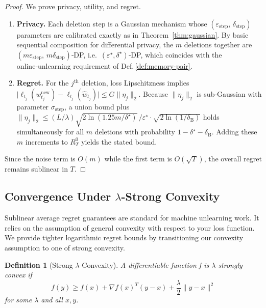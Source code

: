 \documentclass[a4paper,12pt]{article}
\newtheorem{definition}[theorem]{Definition}
\begin{document}
\begin{proof}

We prove privacy, utility, and regret.
\begin{enumerate}
    \item \textbf{Privacy.} Each deletion step is a Gaussian mechanism whose $(\varepsilon_{\text{step}},\, \delta_{\text{step}})$ parameters are calibrated exactly as in Theorem~\ref{thm:gaussian}. By basic sequential composition for differential privacy, the $m$ deletions together are $(m\varepsilon_{\text{step}},\,m\delta_{\text{step}})$‑DP, i.e.\
$(\varepsilon^\star,\delta^\star)$‑DP, which coincides with the online‑unlearning requirement of Def.\,\ref{def:memory-pair}.

    \item \textbf{Regret.} For the $j^{\text{th}}$ deletion, loss Lipschitzness implies 
$\bigl|\ell_{t_j}(w_{t_j}^{\text{new}})-\ell_{t_j}(\hat w_{t_j})\bigr|
      \le G\lVert\eta_j\rVert_{2}$.
Because $\lVert\eta_j\rVert_{2}$ is sub‑Gaussian with parameter
$\sigma_{\text{step}}$, a union bound plus
$\|\eta_j\|_{2} \le
  (L/\lambda)\sqrt{2\ln(1.25m/\delta^{\star})}\,/\varepsilon^{\star}
  \cdot\sqrt{2\ln(1/\delta_{\mathrm{B}})}$
holds simultaneously for all $m$ deletions
with probability $1-\delta^\star-\delta_{\mathrm{B}}$.
Adding these $m$ increments to $R_{T}^{0}$ yields the stated bound.
\end{enumerate}

Since the noise term is $O(m)$ while the first term is
$O(\sqrt{T})$, the overall regret remains sublinear in $T$.
\end{proof}

\subsection{Convergence Under $\lambda$-Strong Convexity}

Sublinear average regret guarantees are standard for machine unlearning work. It relies on the assumption of general convexity with respect to your loss function. We provide tighter logarithmic regret bounds by transitioning our convexity assumption to one of strong convexity.

\begin{definition}[Strong $\lambda$-Convexity]
    A differentiable function f is $\lambda$-strongly convex if 
    $$
    f(y) \geq f(x) + \nabla f(x)^{T}(y-x)+ \frac{\lambda}{2}\|y-x\|^{2}
    $$
    for some $\lambda$ and all $x,y$.
\end{definition}
\end{document}
